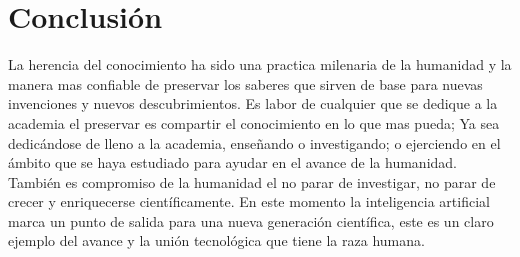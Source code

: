 \documentclass{article}
\begin{document}
\section{Conclusión}
La herencia del conocimiento ha sido una practica milenaria de la humanidad y la manera mas confiable de preservar los saberes que sirven de base para nuevas invenciones y nuevos descubrimientos. Es labor de cualquier que se dedique a la academia el preservar es compartir el conocimiento en lo que mas pueda; Ya sea dedicándose de lleno a la academia, enseñando o investigando; o ejerciendo en el ámbito que se haya estudiado para ayudar en el avance de la humanidad.
También es compromiso de la humanidad el no parar de investigar, no parar de crecer y enriquecerse científicamente. En este momento la inteligencia artificial marca un punto de salida para una nueva generación científica, este es un claro ejemplo del avance y la unión tecnológica que tiene la raza humana.



\end{document}
